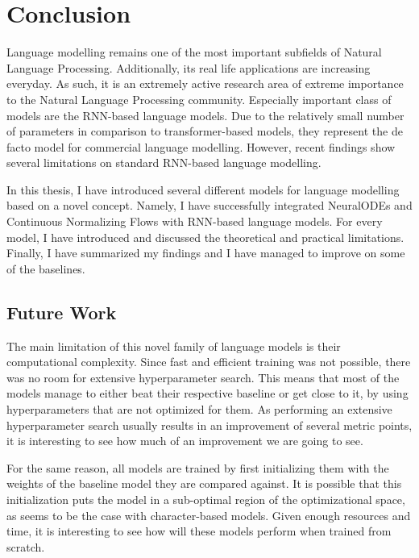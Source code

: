 \chapter{Conclusion}

Language modelling remains one of the most important subfields of Natural Language Processing. Additionally, its real life applications are increasing everyday. As such, it is an extremely active research area of extreme importance to the Natural Language Processing community. Especially important class of models are the RNN-based language models. Due to the relatively small number of parameters in comparison to transformer-based models, they represent the de facto model for commercial language modelling. However, recent findings \citep{yang2017breaking} show several limitations on standard RNN-based language modelling.

In this thesis, I have introduced several different models for language modelling based on a novel concept. Namely, I have successfully integrated NeuralODEs \citep{chen2018neural} and Continuous Normalizing Flows \citep{grathwohl2018ffjord} with RNN-based language models. For every model, I have introduced and discussed the theoretical and practical limitations. Finally, I have summarized my findings and I have managed to improve on some of the baselines.

\section{Future Work}

The main limitation of this novel family of language models is their computational complexity. Since fast and efficient training was not possible, there was no room for extensive hyperparameter search. This means that most of the models manage to either beat their respective baseline or get close to it, by using hyperparameters that are not optimized for them. As performing an extensive hyperparameter search usually results in an improvement of several metric points, it is interesting to see how much of an improvement we are going to see.

For the same reason, all models are trained by first initializing them with the weights of the baseline model they are compared against. It is possible that this initialization puts the model in a sub-optimal region of the optimizational space, as seems to be the case with character-based models. Given enough resources and time, it is interesting to see how will these models perform when trained from scratch.
